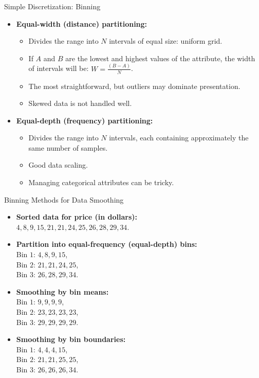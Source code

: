 \begin{frame}{Simple Discretization: Binning}
	\begin{itemize}
		\item \textbf{Equal-width (distance) partitioning:}
		\begin{itemize}
			\item Divides the range into $N$ intervals of equal size: uniform 
			grid.
			\item If $A$ and $B$ are the lowest and highest values of the 
			attribute, the width of intervals will be: $W = \frac{(B - A)}{N}$.
			\item The most straightforward, but outliers may dominate 
			presentation.
			\item Skewed data is not handled well.
		\end{itemize}
		\item \textbf{Equal-depth (frequency) partitioning:}
		\begin{itemize}
			\item Divides the range into $N$ intervals, each containing 
			approximately the same number of samples.
			\item Good data scaling.
			\item Managing categorical attributes can be tricky.
		\end{itemize}
	\end{itemize}
\end{frame}

\begin{frame}{Binning Methods for Data Smoothing}
	\begin{itemize}
		\item \textbf{Sorted data for price (in dollars):} \\
		$4, 8, 9, 15, 21, 21, 24, 25, 26, 28, 29, 34$.
		\item \textbf{Partition into equal-frequency (equal-depth) bins:}\\
		Bin $1$: $4, 8, 9, 15$,\\
		Bin $2$: $21, 21, 24, 25$,\\
		Bin $3$: $26, 28, 29, 34$.
		\item \textbf{Smoothing by bin means:}\\
		Bin $1$: $9, 9, 9, 9$,\\
		Bin $2$: $23, 23, 23, 23$,\\
		Bin $3$: $29, 29, 29, 29$.\\
		\item \textbf{Smoothing by bin boundaries:}\\
		Bin $1$: $4, 4, 4, 15$,\\
		Bin $2$: $21, 21, 25, 25$,\\
		Bin $3$: $26, 26, 26, 34$.\\
	\end{itemize}
\end{frame}

